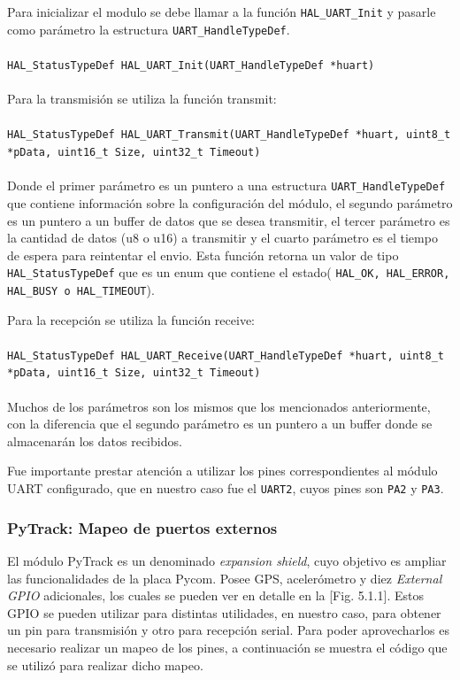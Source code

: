 \documentclass[12pt]{article}
\begin{document}
Para inicializar el modulo se debe llamar a la función \texttt{HAL\_UART\_Init} y pasarle como parámetro la estructura \texttt{UART\_HandleTypeDef}. 
\\\\
\lstinline|HAL_StatusTypeDef HAL_UART_Init(UART_HandleTypeDef *huart)|
\\\\
Para la transmisión se utiliza la función transmit:
\\\\
\lstinline|HAL_StatusTypeDef HAL_UART_Transmit(UART_HandleTypeDef *huart, uint8_t *pData, uint16_t Size, uint32_t Timeout)|
\\\\
Donde el primer parámetro es un puntero a una estructura \texttt{UART\_HandleTypeDef} que contiene información sobre la configuración del módulo, el segundo parámetro es un puntero a un buffer de datos que se desea transmitir, el tercer parámetro es la cantidad de datos (u8 o u16) a transmitir y el cuarto parámetro es el tiempo de espera para reintentar el envio. Esta función retorna un valor de tipo \texttt{HAL\_StatusTypeDef} que es un enum que contiene el estado( \texttt{HAL\_OK, HAL\_ERROR, HAL\_BUSY o HAL\_TIMEOUT}).

Para la recepción se utiliza la función receive:
\\\\
\lstinline|HAL_StatusTypeDef HAL_UART_Receive(UART_HandleTypeDef *huart, uint8_t *pData, uint16_t Size, uint32_t Timeout)|
\\\\
Muchos de los parámetros son los mismos que los mencionados anteriormente, con la diferencia que el segundo parámetro es un puntero a un buffer donde se almacenarán los datos recibidos.

Fue importante prestar atención a utilizar los pines correspondientes al módulo UART configurado, que en nuestro caso fue el \texttt{UART2}, cuyos pines son \texttt{PA2} y \texttt{PA3}.

\subsubsection{PyTrack: Mapeo de puertos externos}
El módulo PyTrack es un denominado \textit{expansion shield}, cuyo objetivo es ampliar las funcionalidades de la placa Pycom. Posee GPS, acelerómetro y diez \textit{External GPIO} adicionales, los cuales se pueden ver en detalle en la [Fig. 5.1.1]. Estos GPIO se pueden utilizar para distintas utilidades, en nuestro caso, para obtener un pin para transmisión y otro para recepción serial. Para poder aprovecharlos es necesario realizar un mapeo de los pines, a continuación se muestra el código que se utilizó para realizar dicho mapeo.
\end{document}
